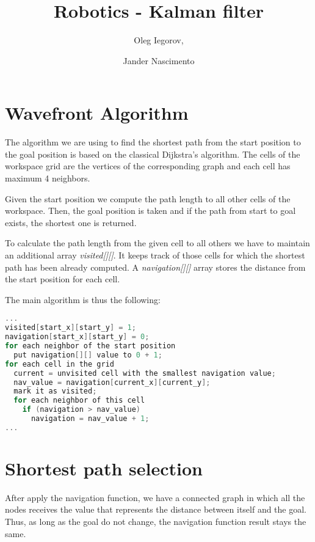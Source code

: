 \documentclass{article}
\begin{document}
\title{Robotics - Kalman filter}

\author{Oleg Iegorov, 
\and Jander Nascimento}

\maketitle

\section{Wavefront Algorithm}

The algorithm we are using to find the shortest path from the start
position to the goal position is based on the classical Dijkstra's
algorithm. The cells of the workspace grid are the vertices of the
corresponding graph and each cell has maximum 4 neighbors.

Given the start position we compute the path length to all other cells
of the workspace. Then, the goal position is taken and if the path from
start to goal exists, the shortest one is returned.

To calculate the path length from the given cell to all others we have
to maintain an additional array \emph{visited[][]}. It keeps track of
those cells for which the shortest path has been already computed.  A
\emph{navigation[][]} array stores the distance from the start position for
each cell.

The main algorithm is thus the following:

\begin{lstlisting}[language=C]
...
visited[start_x][start_y] = 1;
navigation[start_x][start_y] = 0;
for each neighbor of the start position
  put navigation[][] value to 0 + 1;
for each cell in the grid
  current = unvisited cell with the smallest navigation value;
  nav_value = navigation[current_x][current_y];
  mark it as visited;
  for each neighbor of this cell
    if (navigation > nav_value)
      navigation = nav_value + 1;
...
\end{lstlisting}

\section{Shortest path selection}

After apply the navigation function, we have a connected graph in which all the nodes receives the value that represents the distance between itself and the goal. Thus, as long as the goal do not change, the navigation function result stays the same.
 
\end{document}
